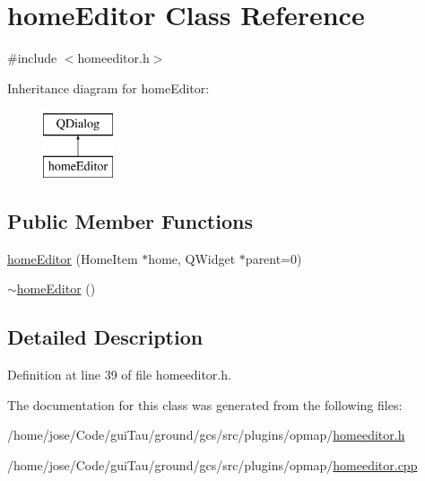 \hypertarget{classhome_editor}{\section{home\-Editor Class Reference}
\label{classhome_editor}
}


{\ttfamily \#include $<$homeeditor.\-h$>$}

Inheritance diagram for home\-Editor\-:\begin{figure}[H]
\begin{center}
\leavevmode
\includegraphics[height=2.000000cm]{classhome_editor}
\end{center}
\end{figure}
\subsection*{Public Member Functions}
\begin{DoxyCompactItemize}
\item 
\hyperlink{group___o_p_map_plugin_ga0036d5e97a686e97c193d02489b4d5fb}{home\-Editor} (Home\-Item $\ast$home, Q\-Widget $\ast$parent=0)
\item 
\hyperlink{group___o_p_map_plugin_ga774f5e26cbfa6c2c2fe3fb6a9317abcf}{$\sim$home\-Editor} ()
\end{DoxyCompactItemize}


\subsection{Detailed Description}


Definition at line 39 of file homeeditor.\-h.



The documentation for this class was generated from the following files\-:\begin{DoxyCompactItemize}
\item 
/home/jose/\-Code/gui\-Tau/ground/gcs/src/plugins/opmap/\hyperlink{homeeditor_8h}{homeeditor.\-h}\item 
/home/jose/\-Code/gui\-Tau/ground/gcs/src/plugins/opmap/\hyperlink{homeeditor_8cpp}{homeeditor.\-cpp}\end{DoxyCompactItemize}
